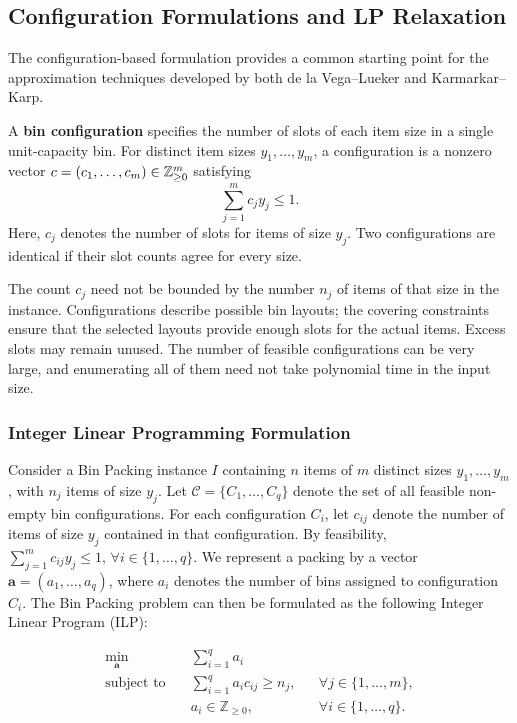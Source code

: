 
\subsection{Configuration Formulations and LP Relaxation}
\label{subsec:bp-binconfig}

The configuration-based formulation provides a common
starting point for the approximation techniques developed
by both de la Vega--Lueker and Karmarkar--Karp.

A \textbf{bin configuration} specifies the number of slots
of each item size in a single unit-capacity bin.
For distinct item sizes $y_1,\ldots,y_m$, a configuration
is a nonzero vector
$c=(c_1,\ldots,c_m)\in\mathbb{Z}_{\geq 0}^m$ satisfying
\[
    \sum_{j=1}^{m} c_j y_j \leq 1.
\]
Here, $c_j$ denotes the number of slots for items of size
$y_j$. Two configurations are identical if their slot
counts agree for every size.

The count $c_j$ need not be bounded by the number $n_j$
of items of that size in the instance. Configurations
describe possible bin layouts; the covering constraints
ensure that the selected layouts provide enough slots
for the actual items. Excess slots may remain unused.
The number of feasible configurations can be very large,
and enumerating all of them need not take polynomial
time in the input size.


\subsubsection{Integer Linear Programming Formulation}
\label{subsubsec:bp-ilp}

Consider a Bin Packing instance $I$ containing $n$
items of $m$ distinct sizes $y_1,\ldots,y_m$, with
$n_j$ items of size $y_j$. Let $\mathcal{C}=\{C_1,\ldots,C_q\}$ denote the
set of all feasible non-empty bin configurations. For each configuration $C_i$, let $c_{ij}$
denote the number of items of size $y_j$
contained in that configuration. By feasibility,
$\sum_{j=1}^{m} c_{ij}y_j \leq 1,\, \forall i\in\{1,\ldots,q\}.$ 
We represent a packing by a vector
$\mathbf{a}=(a_1,\ldots,a_q)$, where $a_i$
denotes the number of bins assigned to
configuration $C_i$. The Bin Packing problem can then be formulated as the following Integer Linear Program (ILP):

\begin{equation}
\label{eq:bp-ilp}
\begin{aligned}
    \min_{\mathbf{a}} \quad
        & \sum_{i=1}^{q} a_i \\[4pt]
    \text{subject to} \quad
        & \sum_{i=1}^{q} a_i c_{ij} \geq n_j,
          && \forall j\in\{1,\ldots,m\},\\
        & a_i \in \mathbb{Z}_{\geq 0},
          && \forall i\in\{1,\ldots,q\}.
\end{aligned}
\end{equation}

